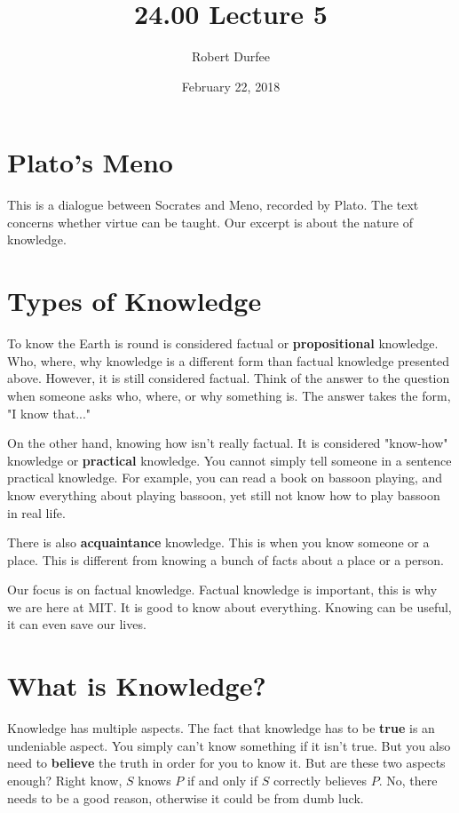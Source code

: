 \documentclass{article}
\title{ 24.00 Lecture 5 }
\author{ Robert Durfee }
\date{ February 22, 2018 }
\begin{document}
\maketitle

\section{ Plato's Meno }

This is a dialogue between Socrates and Meno, recorded by Plato. The text
concerns whether virtue can be taught. Our excerpt is about the nature of
knowledge.

\section{Types of Knowledge}

To know the Earth is round is considered factual or \textbf{propositional}
knowledge. Who, where, why knowledge is a different form than factual knowledge
presented above. However, it is still considered factual. Think of the answer to
the question when someone asks who, where, or why something is. The answer takes
the form, "I know that..."

On the other hand, knowing how isn't really factual. It is considered "know-how"
knowledge or \textbf{practical} knowledge. You cannot simply tell someone in a
sentence practical knowledge. For example, you can read a book on bassoon
playing, and know everything about playing bassoon, yet still not know how to
play bassoon in real life.

There is also \textbf{acquaintance} knowledge. This is when you know someone or
a place. This is different from knowing a bunch of facts about a place or a
person.

Our focus is on factual knowledge. Factual knowledge is important, this is why
we are here at MIT. It is good to know about everything. Knowing can be useful,
it can even save our lives.

\section{What is Knowledge?}

Knowledge has multiple aspects. The fact that knowledge has to be \textbf{true}
is an undeniable aspect. You simply can't know something if it isn't true. But
you also need to \textbf{believe} the truth in order for you to know it. But are
these two aspects enough? Right know, $S$ knows $P$ if and only if $S$ correctly
believes $P$. No, there needs to be a good reason, otherwise it could be from
dumb luck.
\end{document}
